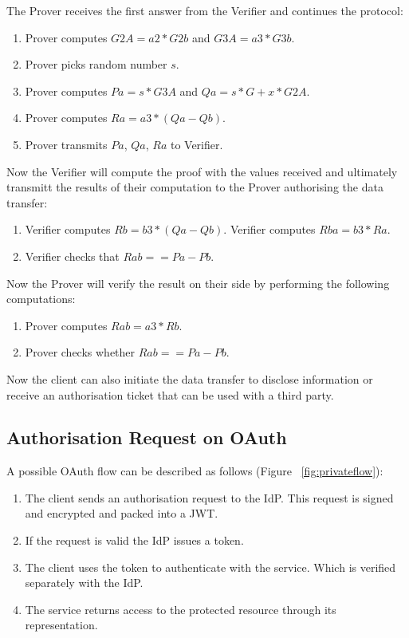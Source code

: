 The Prover receives the first answer from the Verifier and continues the protocol:
\begin{enumerate}
    \item Prover computes $G2A = a2 * G2b$ and $G3A = a3 * G3b$.
    \item Prover picks random number $s$.
    \item Prover computes $Pa = s * G3A$ and $Qa = s * G + x * G2A$.
    \item Prover computes $Ra = a3 * (Qa - Qb)$.
    \item Prover transmits $Pa$, $Qa$, $Ra$ to Verifier.
\end{enumerate}

Now the Verifier will compute the proof with the values received and ultimately transmitt the results of their computation to the Prover authorising the data transfer:
\begin{enumerate}
    \item Verifier computes $Rb = b3 * (Qa - Qb)$.
    \tem Verifier computes $Rba = b3 * Ra$.
    \item Verifier checks that $Rab == Pa - Pb$.
\end{enumerate}

Now the Prover will verify the result on their side by performing the following computations:

\begin{enumerate}
    \item Prover computes $Rab = a3 * Rb$.
    \item Prover checks whether $Rab == Pa - Pb$.
\end{enumerate}

Now the client can also initiate the data transfer to disclose information or receive an authorisation ticket that can be used with a third party.

\subsection{Authorisation Request on OAuth}

A possible OAuth flow can be described as follows (Figure ~\ref{fig:privateflow}):
\begin{enumerate}
    \item The client sends an authorisation request to the IdP. This request is signed and encrypted and packed into a JWT.
    \item If the request is valid the IdP issues a token.
    \item The client uses the token to authenticate with the service. Which is verified separately with the IdP.
    \item The service returns access to the protected resource through its representation.
\end{enumerate}

